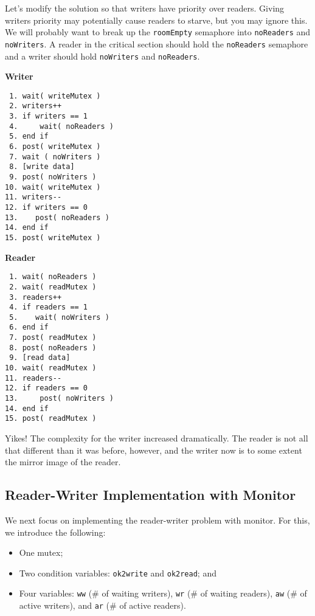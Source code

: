 Let's modify the solution so that writers have priority over readers. Giving writers priority may potentially cause readers to starve, but you may ignore this. We will probably want to break up the \texttt{roomEmpty} semaphore into \texttt{noReaders} and \texttt{noWriters}. A reader in the critical section should hold the \texttt{noReaders} semaphore and a writer should hold \texttt{noWriters} and \texttt{noReaders}.

\begin{multicols}{2}
    \textbf{Writer}\vspace{-2em}
    \begin{verbatim}
 1. wait( writeMutex )
 2. writers++
 3. if writers == 1
 4.     wait( noReaders )
 5. end if
 6. post( writeMutex )
 7. wait ( noWriters )
 8. [write data]
 9. post( noWriters )
10. wait( writeMutex )
11. writers--
12. if writers == 0
13.    post( noReaders )
14. end if
15. post( writeMutex )
    \end{verbatim}
    \columnbreak
    \textbf{Reader}\vspace{-2em}
    \begin{verbatim}
 1. wait( noReaders )
 2. wait( readMutex )
 3. readers++
 4. if readers == 1
 5.    wait( noWriters )
 6. end if
 7. post( readMutex )
 8. post( noReaders )
 9. [read data]
10. wait( readMutex )
11. readers--
12. if readers == 0
13.     post( noWriters )
14. end if
15. post( readMutex )
    \end{verbatim}
\end{multicols}
\vspace{-2em}

Yikes! The complexity for the writer increased dramatically. The reader is not all that different than it was before, however, and the writer now is to some extent the mirror image of the reader.

\subsection*{Reader-Writer Implementation with Monitor}

We next focus on implementing the reader-writer problem with monitor.
For this, we introduce the following:
\begin{itemize}
    \item One mutex;
    \item Two condition variables: \texttt{ok2write} and \texttt{ok2read}; and
    \item Four variables: \texttt{ww} (\# of waiting writers), \texttt{wr} (\# of waiting readers), \texttt{aw} (\# of active writers), and \texttt{ar} (\# of active readers).
\end{itemize}

